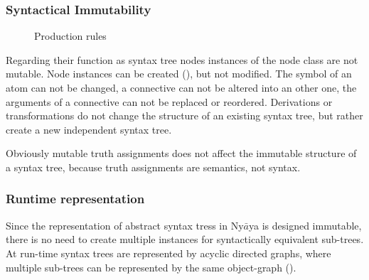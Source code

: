\subsubsection{Syntactical Immutability}

\begin{figure}[htbp]
\begin{center}
\caption{Production rules}
\label{fig:NyayaNodeCreation}
\end{center}
\end{figure}

Regarding their function as syntax tree nodes instances of the node class are not mutable. 
Node instances can be created (), but not modified.
The symbol of an atom can not be changed, 
a connective can not be altered into an other one,
the arguments of a connective can not be replaced or reordered.
Derivations or transformations do not change the structure of an existing syntax tree,
but rather create a new independent syntax tree.

Obviously mutable truth assignments does not affect the immutable structure of a syntax tree,
because truth assignments are semantics, not syntax. 

\subsubsection{Runtime representation}

Since the representation of abstract syntax tress in Ny$\bar{a}$ya is designed immutable,
there is no need to create multiple instances for syntactically equivalent sub-trees. 
At run-time syntax trees are represented by acyclic directed graphs, 
where multiple sub-trees can be represented by the same object-graph
().

